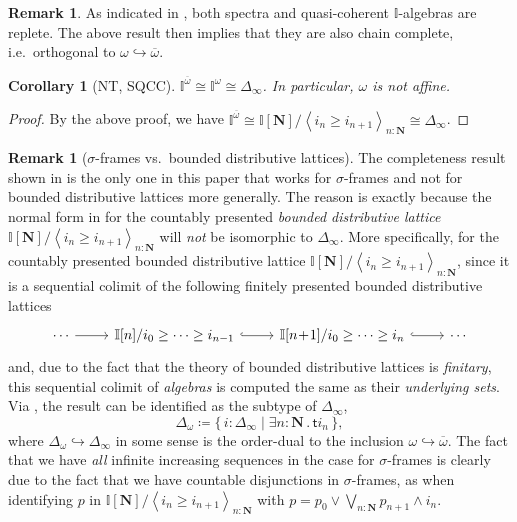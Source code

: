 \documentclass[a4paper,12pt]{amsart}
\newtheorem{corollary}[theorem]{Corollary}
\theoremstyle{definition}
\newtheorem{remark}[theorem]{Remark}
\newcommand{\mb}[1]{\mathbf{#1}}
\newcommand{\mbb}[1]{\mathbb{#1}}
\newcommand{\I}{\mbb I}
\newcommand{\ms}[1]{\mathsf{#1}}
\newcommand{\ov}[1]{\overline{#1}}
\newcommand{\pair}[1]{\left\langle#1\right\rangle}
\newcommand{\scomp}[2]{\{\,#1\mid#2\,\}}
\newcommand{\hook}{\hookrightarrow}
\newcommand{\N}{\mb N}
\newcommand{\ex}[2]{\exists #1\!\colon\!\!#2\mathpunct{.}}
\begin{document}
\begin{remark}
  As indicated in , both spectra and quasi-coherent $\I$-algebras are replete. The above result then implies that they are also chain complete, i.e.\ orthogonal to $\omega\hook\ov\omega$.
\end{remark}

\begin{corollary}[NT, SQCC]
  $\I^{\ov\omega} \cong \I^\omega \cong \Delta_\infty$. In particular, $\omega$ is not affine.
\end{corollary}
\begin{proof}
  By the above proof, we have $\I^{\ov\omega} \cong \I[\N]/\pair{i_n \ge i_{n+1}}_{n:\N} \cong \Delta_\infty$.
\end{proof}

\begin{remark}[$\sigma$-frames vs.\ bounded distributive lattices]\label{rem:whynotdis}
  The completeness result shown in  is the only one in this paper that works for $\sigma$-frames and not for bounded distributive lattices more generally. The reason is exactly because the normal form in  for the countably presented \emph{bounded distributive lattice} $\I[\N]/\pair{i_n \ge i_{n+1}}_{n:\N}$ will \emph{not} be isomorphic to $\Delta_\infty$. More specifically, for the countably presented bounded distributive lattice $\I[\N]/\pair{i_n \ge i_{n+1}}_{n:\N}$, since it is a sequential colimit of the following finitely presented bounded distributive lattices
  \[ 
  \begin{tikzcd}
    \cdots \ar[r] & \I[n]/i_{0} \ge \cdots \ge i_{n-1} \ar[r, hook] & \I[n\!+\!1]/i_0 \ge \cdots \ge i_n \ar[r, hook] & \cdots
  \end{tikzcd}
  \]
  and, due to the fact that the theory of bounded distributive lattices is \emph{finitary}, this sequential colimit of \emph{algebras} is computed the same as their \emph{underlying sets}. Via , the result can be identified as the subtype of $\Delta_\infty$,
  \[ \Delta_\omega \coloneq \scomp{i : \Delta_\infty}{\ex n\N \ms ti_n}, \]
  where $\Delta_\omega \hook \Delta_\infty$ in some sense is the order-dual to the inclusion $\omega\hook\ov\omega$. The fact that we have \emph{all} infinite increasing sequences in the case for $\sigma$-frames is clearly due to the fact that we have countable disjunctions in $\sigma$-frames, as when identifying $p$ in $\I[\N]/\pair{i_n \ge i_{n+1}}_{n:\N}$ with $p = p_0 \vee \bigvee_{n:\N}p_{n+1}\wedge i_n$.
\end{remark}
\end{document}
